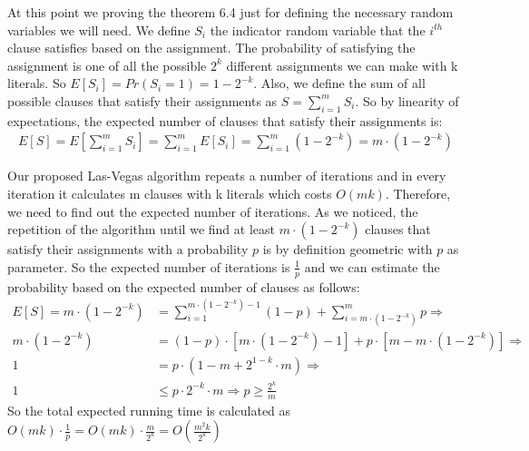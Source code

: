 \documentclass[11pt]{537homework}
\begin{document}
At this point we proving the theorem 6.4 just for defining the necessary random variables we will need. We define $S_i$ the indicator random variable that the $i^{th}$ clause satisfies based on the assignment. The probability of satisfying the assignment is one of all the possible $2^k$ different assignments we can make with k literals. So $E[S_i] = Pr(S_i = 1) = 1 - 2^{-k}$. Also, we define the sum of all possible clauses that satisfy their assignments as $S = \sum_{i=1}^{m} S_i$. So by linearity of expectations, the expected number of clauses that satisfy their assignments is:
\begin{align*}
    E[S] = E[\sum_{i=1}^{m} S_i] = \sum_{i=1}^{m} E[S_i] = \sum_{i=1}^{m} (1 -2^{-k}) = m \cdot (1-2^{-k})
\end{align*}
\par Our proposed Las-Vegas algorithm repeats a number of iterations and in every iteration it calculates m clauses with k literals which costs $O(mk)$. Therefore, we need to find out the expected number of iterations. As we noticed, the repetition of the algorithm until we find at least $m \cdot (1-2^{-k})$ clauses that satisfy their assignments with a probability $p$ is by definition geometric with $p$ as parameter. So the expected number of iterations is $\frac{1}{p}$ and we can estimate the probability based on the expected number of clauses as follows:
\begin{align*}
    E[S] =  m \cdot (1-2^{-k}) &= \sum_{i=1}^{m \cdot (1-2^{-k}) -1} (1-p) + \sum_{i=m \cdot (1-2^{-k})}^{m} p \Longrightarrow \\
    m \cdot (1-2^{-k}) &= (1-p) \cdot [m \cdot (1-2^{-k}) -1]  + p \cdot [m  - m\cdot (1-2^{-k}) ] \Longrightarrow \\
    1 &= p \cdot (1-m + 2^{1-k} \cdot m) \Longrightarrow \\
    1 &\leq p \cdot 2^{-k} \cdot m \Longrightarrow p \geq \frac{2^k}{m}
\end{align*}
So the total expected running time is calculated as $O(mk) \cdot \frac{1}{p} = O(mk) \cdot \frac{m}{2^k} = O(\frac{m^2k}{2^k})$
\end{document}
